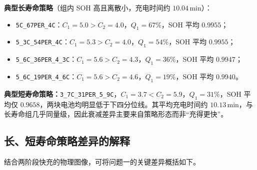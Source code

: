 \textbf{典型长寿命策略}（组内 SOH 高且离散小，充电时间约 \(10.04\)\,min）：
\begin{itemize}
  \item \texttt{5C\_67PER\_4C}：\(C_1=5.0>C_2=4.0\)，\(Q_1=67\%\)，SOH 平均 \(0.9955\)；
  \item \texttt{5\_3C\_54PER\_4C}：\(C_1=5.3>C_2=4.0\)，\(Q_1=54\%\)，SOH 平均 \(0.9955\)；
  \item \texttt{5\_6C\_36PER\_4\_3C}：\(C_1=5.6>C_2=4.3\)，\(Q_1=36\%\)，SOH 平均 \(0.9947\)；
  \item \texttt{5\_6C\_19PER\_4\_6C}：\(C_1=5.6>C_2=4.6\)，\(Q_1=19\%\)，SOH 平均 \(0.9940\)。
\end{itemize}

\textbf{典型短寿命策略：}\texttt{3\_7C\_31PER\_5\_9C}，\(C_1=3.7<C_2=5.9\)，\(Q_1=31\%\)，SOH 平均仅 \(0.9658\)，两块电池均明显低于下四分位线。其平均充电时间约 \(10.13\)\,min，与长寿命组几乎同量级，因此衰减差异主要来自策略形态而非“充得更快”。

\subsection{长、短寿命策略差异的解释}

结合两阶段快充的物理图像\cite{liu2019fastcharging,dubarry2009lfp,ma2024mcc,ahmed2017enabling}，可将问题一的关键差异概括如下。

